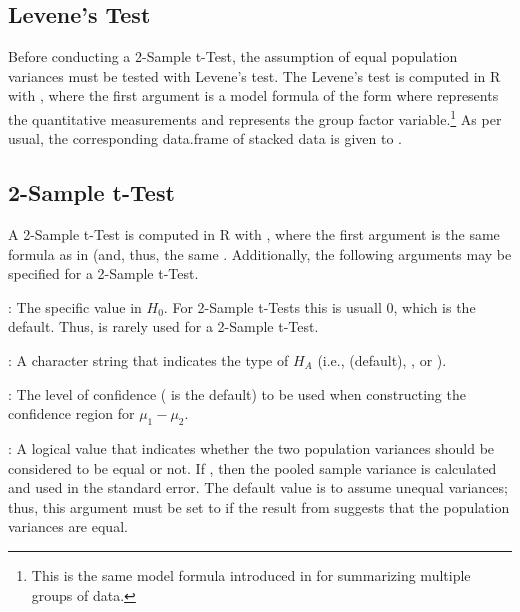 \documentclass[10pt,openany]{book}\usepackage[]{graphicx}\usepackage[]{color}
\begin{document}

\vspace{-12pt}

\subsection{Levene's Test}
\vspace{-12pt}
Before conducting a 2-Sample t-Test, the assumption of equal population variances must be tested with Levene's test.  The Levene's test is computed in R with , where the first argument is a model formula of the form  where  represents the quantitative measurements and  represents the group factor variable.\footnote{This is the same model formula introduced in  for summarizing multiple groups of data.} As per usual, the corresponding data.frame of stacked data is given to .

\subsection{2-Sample t-Test}
\vspace{-12pt}
A 2-Sample t-Test is computed in R with , where the first argument is the same formula as in  (and, thus, the same .  Additionally, the following arguments may be specified for a 2-Sample t-Test.
\begin{Itemize}
  \item {}: The specific value in $H_{0}$. For 2-Sample t-Tests this is usuall $0$, which is the default. Thus,  is rarely used for a 2-Sample t-Test.
  \item {}: A character string that indicates the type of $H_{A}$ (i.e.,  (default), , or ).
  \item {}: The level of confidence ( is the default) to be used when constructing the confidence region for $\mu_{1}-\mu_{2}$.
  \item {}: A logical value that indicates whether the two population variances should be considered to be equal or not.  If , then the pooled sample variance is calculated and used in the standard error.  The default value is to assume unequal variances; thus, this argument must be set to  if the result from  suggests that the population variances are equal.
\end{Itemize}
\end{document}
